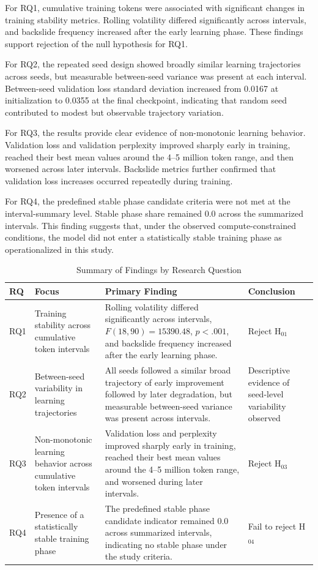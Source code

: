 \documentclass{article}
\begin{document}
For RQ1, cumulative training tokens were associated with significant changes in training stability metrics. Rolling volatility differed significantly across intervals, and backslide frequency increased after the early learning phase. These findings support rejection of the null hypothesis for RQ1.

For RQ2, the repeated seed design showed broadly similar learning trajectories across seeds, but measurable between-seed variance was present at each interval. Between-seed validation loss standard deviation increased from 0.0167 at initialization to 0.0355 at the final checkpoint, indicating that random seed contributed to modest but observable trajectory variation.

For RQ3, the results provide clear evidence of non-monotonic learning behavior. Validation loss and validation perplexity improved sharply early in training, reached their best mean values around the 4--5 million token range, and then worsened across later intervals. Backslide metrics further confirmed that validation loss increases occurred repeatedly during training.

For RQ4, the predefined stable phase candidate criteria were not met at the interval-summary level. Stable phase share remained 0.0 across the summarized intervals. This finding suggests that, under the observed compute-constrained conditions, the model did not enter a statistically stable training phase as operationalized in this study.

\begin{table}[h]
\centering
\caption{Summary of Findings by Research Question}
\label{tab:results_summary}
\begin{tabular}{p{1.3cm} p{4.2cm} p{5.5cm} p{3cm}}
\hline
\textbf{RQ} & \textbf{Focus} & \textbf{Primary Finding} & \textbf{Conclusion} \\
\hline
RQ1 & 
Training stability across cumulative token intervals & 
Rolling volatility differed significantly across intervals, $F(18, 90) = 15390.48$, $p < .001$, and backslide frequency increased after the early learning phase. & 
Reject H$_{01}$ \\
\hline
RQ2 & 
Between-seed variability in learning trajectories & 
All seeds followed a similar broad trajectory of early improvement followed by later degradation, but measurable between-seed variance was present across intervals. & 
Descriptive evidence of seed-level variability observed \\
\hline
RQ3 & 
Non-monotonic learning behavior across cumulative token intervals & 
Validation loss and perplexity improved sharply early in training, reached their best mean values around the 4--5 million token range, and worsened during later intervals. & 
Reject H$_{03}$ \\
\hline
RQ4 & 
Presence of a statistically stable training phase & 
The predefined stable phase candidate indicator remained 0.0 across summarized intervals, indicating no stable phase under the study criteria. & 
Fail to reject H$_{04}$ \\
\hline
\end{tabular}
\end{table}
\end{document}
